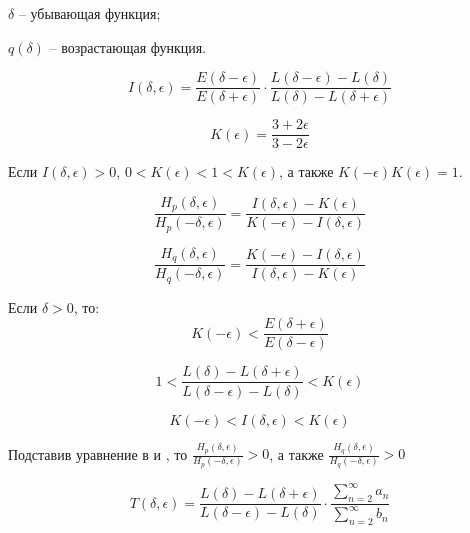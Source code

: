 $\delta$ -- убывающая функция;

$q(\delta)$ -- возрастающая функция.

\begin{equation}
	\label{eq:equation95}
	I(\delta, \epsilon) = \frac{E(\delta - \epsilon)}{E(\delta + \epsilon)} \cdot \frac{L(\delta - \epsilon) - L(\delta)}{L(\delta) - L(\delta + \epsilon)}
\end{equation}

\begin{equation}
	\label{eq:equation96}
	K(\epsilon) = \frac{3 + 2\epsilon}{3 - 2\epsilon}
\end{equation}

Если $I(\delta, \epsilon) > 0$, $0 < K(\epsilon) < 1 < K (\epsilon)$, а также $K(- \epsilon)K(\epsilon) = 1$.

\begin{equation}
	\label{eq:equation97}
	\frac{H_{p}(\delta, \epsilon)}{H_{p}(- \delta, \epsilon)} = \frac{I(\delta, \epsilon) - K(\epsilon)}{K(- \epsilon) - I(\delta, \epsilon)}
\end{equation}

\begin{equation}
	\label{eq:equation98}
	\frac{H_{q}(\delta, \epsilon)}{H_{q}(- \delta, \epsilon)} = \frac{K(- \epsilon) -  I(\delta, \epsilon)}{I(\delta, \epsilon) - K(\epsilon)}
\end{equation}

Если $\delta > 0$, то:
\begin{equation}
	\label{eq:equation99}
	K(- \epsilon) < \frac{E(\delta + \epsilon)}{E(\delta - \epsilon)}
\end{equation}

\begin{equation}
	\label{eq:equation100}
	1 < \frac{L(\delta) - L(\delta + \epsilon)}{L(\delta - \epsilon) - L(\delta)} < K(\epsilon)
\end{equation}

\begin{equation}
	\label{eq:equation101}
	K(- \epsilon) < I(\delta, \epsilon) < K(\epsilon)
\end{equation}

Подставив уравнение  в   и  , то $\frac{H_{p}(\delta, \epsilon)}{H_{p}(- \delta, \epsilon)} > 0$, а также $\frac{H_{q}(\delta, \epsilon)}{H_{q}(- \delta, \epsilon)} > 0$

\begin{equation}
	\label{eq:equation102}
	T(\delta,  \epsilon) = \frac{L(\delta) - L(\delta + \epsilon)}{L(\delta - \epsilon) - L(\delta)} \cdot \frac{ \sum_{n = 2}^{\infty} a_{n}}{\sum_{n = 2}^{\infty} b_{n}}
\end{equation}

